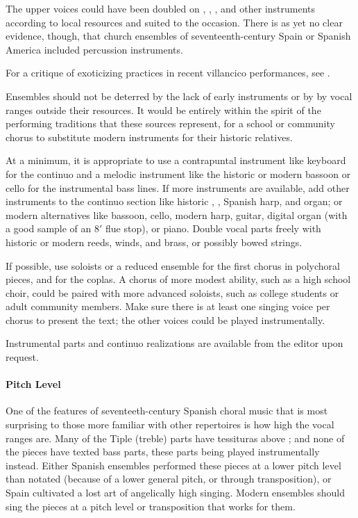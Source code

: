 The upper voices could have been doubled on ,
, , and other instruments
according to local resources and suited to the occasion.
There is as yet no clear evidence, though, that church ensembles of 
seventeenth-century Spain or Spanish America included percussion instruments.%
\begin{Footnote}
  For a critique of exoticizing practices in recent villancico performances,  
  see \autocite{Baker:PerformancePostColonial}.
\end{Footnote}

Ensembles should not be deterred by the lack of early instruments or by by vocal
ranges outside their resources.
It would be entirely within the spirit of the performing traditions that these
sources represent, for a school or community chorus to substitute modern
instruments for their historic relatives.

At a minimum, it is appropriate to use a contrapuntal instrument like keyboard
for the continuo and a melodic instrument like the historic  or
modern bassoon or cello for the instrumental bass lines.
If more instruments are available, add other instruments to the continuo
section like historic , , Spanish harp, and organ;
or modern alternatives like bassoon, cello, modern harp, guitar, digital
organ (with a good sample of an 8$'$ flue stop), or piano.
Double vocal parts freely with historic or modern reeds, winds, and brass, or
possibly bowed strings.

If possible, use soloists or a reduced ensemble for the first chorus in
polychoral pieces, and for the coplas.
A chorus of more modest ability, such as a high school choir, could be paired
with more advanced soloists, such as college students or adult community
members.
Make sure there is at least one singing voice per chorus to present the text;
the other voices could be played instrumentally.

Instrumental parts and continuo realizations are available from the editor upon
request.

\paragraph{Pitch Level}
One of the features of seventeeth-century Spanish choral music that is most
surprising to those more familiar with other repertoires is how high the vocal
ranges are.
Many of the Tiple (treble) parts have tessituras above ; and none of
the pieces have texted bass parts, these parts being played instrumentally
instead.
Either Spanish ensembles performed these pieces at a lower pitch level than
notated (because of a lower general pitch, or through transposition), or Spain
cultivated a lost art of angelically high singing.
Modern ensembles should sing the pieces at a pitch level or transposition that
works for them.

